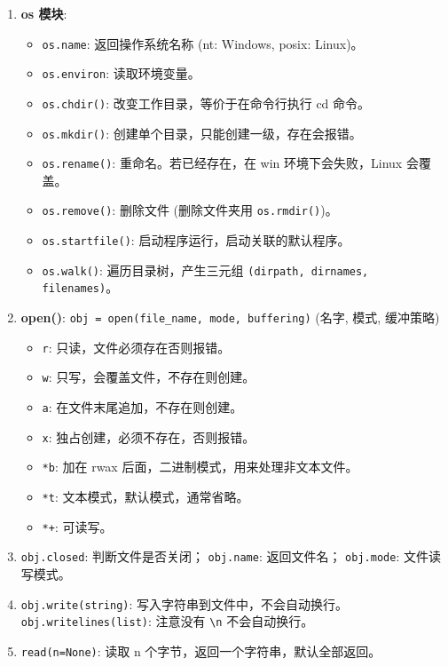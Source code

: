 \documentclass[a4paper, 12pt]{article}
\newcommand{\code}[1]{\texttt{\color{blue!60!black}#1}}
\newcommand{\kw}[1]{\textbf{#1}} %
\newcommand{\threedigits}[1]{%
  \ifnum#1<10 00#1%
  \else\ifnum#1<100 0#1%
  \else #1%
  \fi\fi%
}
\begin{document}
\begin{enumerate}[label=\textbf{\protect\threedigits{\value*}.}, leftmargin=3.5em, itemsep=0.8ex, parsep=0.5ex]
    \item \kw{os 模块}:
    \begin{itemize}
        \item \code{os.name}: 返回操作系统名称 (nt: Windows, posix: Linux)。
        \item \code{os.environ}: 读取环境变量。
        \item \code{os.chdir()}: 改变工作目录，等价于在命令行执行 cd 命令。
        \item \code{os.mkdir()}: 创建单个目录，只能创建一级，存在会报错。
        \item \code{os.rename()}: 重命名。若已经存在，在 win 环境下会失败，Linux 会覆盖。
        \item \code{os.remove()}: 删除文件 (删除文件夹用 \code{os.rmdir()})。
        \item \code{os.startfile()}: 启动程序运行，启动关联的默认程序。
        \item \code{os.walk()}: 遍历目录树，产生三元组 \code{(dirpath, dirnames, filenames)}。
    \end{itemize}
    
    \item \kw{open()}: \code{obj = open(file\_name, mode, buffering)} (名字, 模式, 缓冲策略)
    \begin{itemize}
        \item \code{r}: 只读，文件必须存在否则报错。
        \item \code{w}: 只写，会覆盖文件，不存在则创建。
        \item \code{a}: 在文件末尾追加，不存在则创建。
        \item \code{x}: 独占创建，必须不存在，否则报错。
        \item \code{*b}: 加在 rwax 后面，二进制模式，用来处理非文本文件。
        \item \code{*t}: 文本模式，默认模式，通常省略。
        \item \code{*+}: 可读写。
    \end{itemize}
    
    \item \code{obj.closed}: 判断文件是否关闭； \code{obj.name}: 返回文件名； \code{obj.mode}: 文件读写模式。
    
    \item \code{obj.write(string)}: 写入字符串到文件中，不会自动换行。 \code{obj.writelines(list)}: 注意没有 \code{\textbackslash n} 不会自动换行。
    
    \item \code{read(n=None)}: 读取 n 个字节，返回一个字符串，默认全部返回。
    

\end{enumerate}
\end{document}
